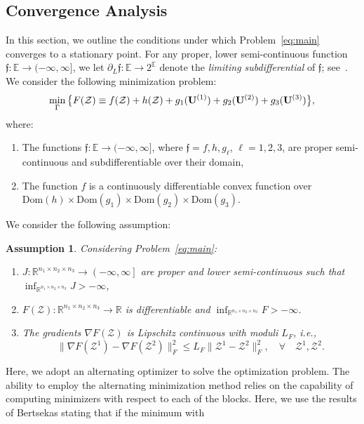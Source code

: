 \documentclass{article}
\newcommand{\R}{{\mathbb R}}
\newcommand{\T}{\mathcal}
\newcommand{\m}[1]{{\bf{#1}}}
\newcommand{\mb}[1]{{\mathbb{#1}}}
\newcommand{\mf}[1]{{\mathfrak{#1}}}
\newtheorem{assumption}{Assumption}
\begin{document}
\subsection{Convergence Analysis}\label{sec:con.a}
In this section, we outline the conditions under which Problem~\eqref{eq:main} converges to a stationary point. For any proper, lower semi-continuous function $\mf f : \mb E \rightarrow (-\infty, \infty]$, we let $\partial_L \mf f : \mb E \rightarrow 2^{\mb E}$ denote the \textit{limiting subdifferential} of $\mf f$; see~\cite[Definition 8.3]{rockafellar2009variational}.
We consider the following minimization problem: 
\begin{equation}\label{eq:ca:1}
\min\limits_{\Gamma} \big{\{}F(\T Z)\equiv f(\T Z)+h(\T Z)+g_1(\m U^{(1)})+ g_2(\m U^{(2)})+g_3(\m U^{(3)})\big{\}}, 
\end{equation}
where:
\begin{enumerate}
    \item The functions $\mf f : \mb E \to (-\infty, \infty]$, where $\mf f=f,h,g_\ell$, $\ell=1,2,3$, are proper semi-continuous and subdifferentiable over their domain, 
\item The function $f$ is a continuously differentiable convex function over $\text{Dom}(h) \times\text{Dom}(g_1) \times \text{Dom}(g_2) \times\text{Dom}(g_3)$. 
\end{enumerate}
We consider the following assumption: 
\begin{assumption}\label{assump:A}
Considering Problem~\eqref{eq:main}:
\begin{enumerate}
\item $J: \R^{n_{1} \times n_{2} \times n_{3} } \rightarrow \left(-\infty , \infty\right]$  are proper and lower semi-continuous such that\\ $\inf_{\R^{n_{1} \times n_{2} \times n_{3} }}J > -\infty$, 
    \item $F(\T Z): \R^{n_{1} \times n_{2} \times  n_{3}} \rightarrow \R$ is differentiable and $\inf_{\R^{n_{1} \times n_{2} \times n_{3}}} F > -\infty$.
    \item  The gradients $\nabla F(\T Z)$ is Lipschitz continuous with moduli $L_F$, i.e.,
\begin{equation*}
\|\nabla F(\T Z^1) - \nabla F(\T Z^2)\|_F^2 \leq L_F\| \T Z^1 - \T Z^2 \|_F^2, \quad \forall \quad \T Z^{1}, \T Z^{2}.
  \end{equation*} 
\end{enumerate}
\end{assumption}
Here, we adopt an alternating optimizer to solve the optimization problem. The ability to employ the alternating minimization method relies on the capability of computing minimizers with respect to each of the blocks.  Here, we use the results of Bertsekas \cite{bertsekas1999nonlinear}  stating that if the minimum with
\end{document}
